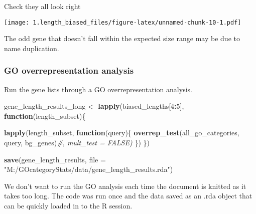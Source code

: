 \documentclass[]{article}
\newenvironment{Shaded}{\begin{snugshade}}{\end{snugshade}}
\newcommand{\KeywordTok}[1]{\textcolor[rgb]{0.13,0.29,0.53}{\textbf{#1}}}
\newcommand{\DataTypeTok}[1]{\textcolor[rgb]{0.13,0.29,0.53}{#1}}
\newcommand{\DecValTok}[1]{\textcolor[rgb]{0.00,0.00,0.81}{#1}}
\newcommand{\StringTok}[1]{\textcolor[rgb]{0.31,0.60,0.02}{#1}}
\newcommand{\CommentTok}[1]{\textcolor[rgb]{0.56,0.35,0.01}{\textit{#1}}}
\newcommand{\ControlFlowTok}[1]{\textcolor[rgb]{0.13,0.29,0.53}{\textbf{#1}}}
\newcommand{\OperatorTok}[1]{\textcolor[rgb]{0.81,0.36,0.00}{\textbf{#1}}}
\newcommand{\NormalTok}[1]{#1}
\begin{document}
Check they all look right

\begin{Shaded}
\end{Shaded}

\texttt{[image: 1.length\_biased\_files/figure-latex/unnamed-chunk-10-1.pdf]}

The odd gene that doesn't fall within the expected size range may be due
to name duplication.

\subsubsection{GO overrepresentation
analysis}\label{go-overrepresentation-analysis}

Run the gene lists through a GO overrepresentation analysis.

\begin{Shaded}
\begin{Highlighting}[]
\NormalTok{gene_length_results_long <-}\StringTok{ }\KeywordTok{lapply}\NormalTok{(biased_lengths[}\DecValTok{4}\OperatorTok{:}\DecValTok{5}\NormalTok{], }\ControlFlowTok{function}\NormalTok{(length_subset)\{}
  
  \KeywordTok{lapply}\NormalTok{(length_subset, }\ControlFlowTok{function}\NormalTok{(query)\{}
    \KeywordTok{overrep_test}\NormalTok{(all_go_categories, query, bg_genes)}\CommentTok{#, mult_test = FALSE)}
\NormalTok{  \})}
\NormalTok{\})}

\KeywordTok{save}\NormalTok{(gene_length_results, }\DataTypeTok{file =} \StringTok{"M:/GOcategoryStats/data/gene_length_results.rda"}\NormalTok{)}
\end{Highlighting}
\end{Shaded}

We don't want to run the GO analysis each time the document is knitted
as it takes too long. The code was run once and the data saved as an
.rda object that can be quickly loaded in to the R session.
\end{document}
